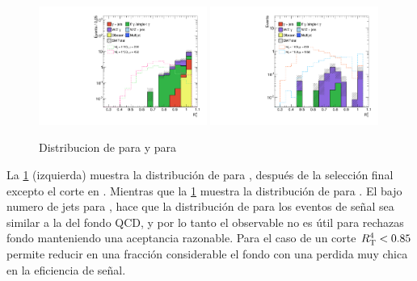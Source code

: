 

\begin{figure}[!htbp]
  \centering

  \includegraphics[width=0.49\textwidth]{figures/rt4_srl}
  \includegraphics[width=0.49\textwidth]{figures/rt2_srh}

  \caption{Distribucion de {\rt} para {\SRL} y {\rtt} para {\SRH}}
  \label{fig:opt_rt}
\end{figure}

La \cref{fig:opt_rt} (izquierda) muestra la distribución de {\rtt} para {\SRH},
después de la selección final excepto el corte en {\rtt}. Mientras que la
\cref{fig:opt_rt} muestra la distribución de {\rt} para {\SRL}. El bajo numero
de jets para {\SRH}, hace que la distribución de {\rtt} para los eventos de
señal sea similar a la del fondo QCD, y por lo tanto el observable no es útil
para rechazas fondo manteniendo una aceptancia razonable. Para el caso de {\SRL}
un corte $R_{\mathrm{T}}^{4} < 0.85$ permite reducir en una fracción considerable el fondo con
una perdida muy chica en la eficiencia de señal.



